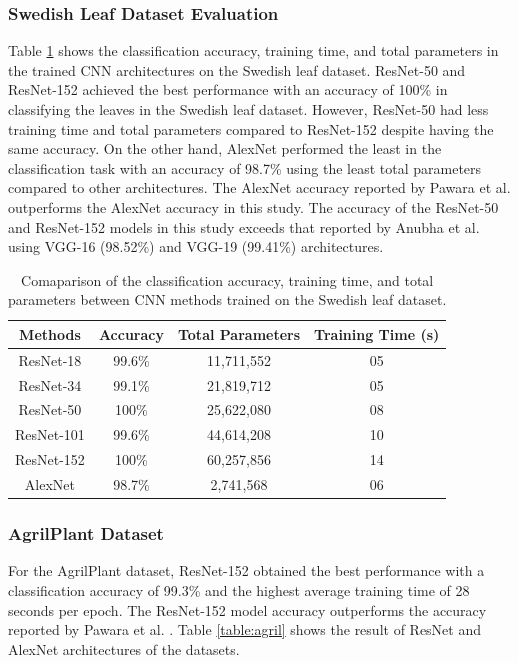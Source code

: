 \documentclass[conference]{IEEEtran}
\begin{document}
\subsubsection{Swedish Leaf Dataset Evaluation} 
Table \ref{tab1} shows the classification accuracy, training time, and total parameters in the trained CNN architectures on the Swedish leaf dataset. ResNet-50 and ResNet-152 achieved the best performance with an accuracy of 100\% in classifying the leaves in the Swedish leaf dataset. However, ResNet-50 had less training time and total parameters compared to ResNet-152 despite having the same accuracy. On the other hand, AlexNet performed the least in the classification task with an accuracy of 98.7\% using the least total parameters compared to other architectures. The AlexNet accuracy reported by Pawara et al. \cite{pawara2017data} outperforms the AlexNet accuracy in this study. The accuracy of the ResNet-50 and ResNet-152 models in this study exceeds that reported by Anubha et al. \cite{anubha2019study} using VGG-16 (98.52\%) and VGG-19 (99.41\%) architectures.
\begin{table}[htbp]
\caption{Comaparison of the classification accuracy, training time, and total parameters between CNN methods trained on the Swedish leaf dataset.}
\begin{center}
\begin{tabular}{c|c|c|c}

\textbf{Methods} & \textbf{Accuracy}& \textbf{Total Parameters}& \textbf{Training Time (s)} \\
\hline
\hline
ResNet-18 & 99.6\%& 11,711,552 & 05 \\
\hline
ResNet-34 & 99.1\%& 21,819,712 & 05 \\
\hline
ResNet-50 & 100\%& 25,622,080 & 08 \\
\hline
ResNet-101 & 99.6\%& 44,614,208 & 10 \\
\hline
ResNet-152 & 100\%& 60,257,856 & 14 \\
\hline
AlexNet & 98.7\%& 2,741,568 & 06 \\

\end{tabular}
\label{tab1}
\end{center}
\end{table}

\subsubsection{AgrilPlant Dataset}
For the AgrilPlant dataset, ResNet-152 obtained the best performance with a classification accuracy of 99.3\% and the highest average training time of 28 seconds per epoch. The ResNet-152 model accuracy outperforms the accuracy reported by Pawara et al. \cite{pawara2017comparing}. Table \ref{table:agril} shows the result of ResNet and AlexNet architectures of the datasets. 
\end{document}
